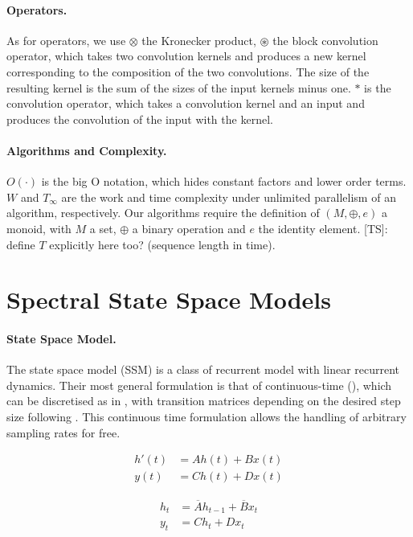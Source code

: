 \documentclass{article}
\newcommand{\TS}[1]{{\color{pink}[TS]: #1}}
\begin{document}
\paragraph{Operators.} As for operators, we use $\otimes$ the Kronecker product, $\circledast$ the block convolution operator, which takes two convolution kernels and produces a new kernel corresponding to the composition of the two convolutions. The size of the resulting kernel is the sum of the sizes of the input kernels minus one. $\ast$ is the convolution operator, which takes a convolution kernel and an input and produces the convolution of the input with the kernel.

\paragraph{Algorithms and Complexity.} $O(\cdot)$ is the big O notation, which hides constant factors and lower order terms. $W$ and $T_\infty$ are the work and time complexity under unlimited parallelism of an algorithm, respectively. Our algorithms require the definition of $(M, \oplus, e)$ a monoid, with $M$ a set, $\oplus$ a binary operation and $e$ the identity element.
\TS{define $T$ explicitly here too? (sequence length in time).}

\section{Spectral State Space Models}

\paragraph{State Space Model.} The state space model (SSM) is a class of recurrent model with linear recurrent dynamics. Their most general formulation is that of continuous-time (), which can be discretised as in , with transition matrices depending on the desired step size following . This continuous time formulation allows the handling of arbitrary sampling rates for free.

\begin{minipage}[t]{.45\linewidth}
  \begin{subequations}
    \label{eq:ssm}
    \begin{align}
      h'(t) &= A h(t) + B x(t) \\
      y(t) &= C h(t) + D x(t)
    \end{align}
  \end{subequations}
\end{minipage}%
\begin{minipage}[t]{.45\linewidth}
  \begin{subequations}
    \label{eq:ssm:recurrence}
    \begin{align}
    \label{eq:ssm:recurrence:1}
      h_{t} &= \overline{A} h_{t-1} + \overline{B} x_t \\
    \label{eq:ssm:recurrence:2}
      y_t &= C h_t + D x_t
    \end{align}
  \end{subequations}
\end{minipage}%
\end{document}

